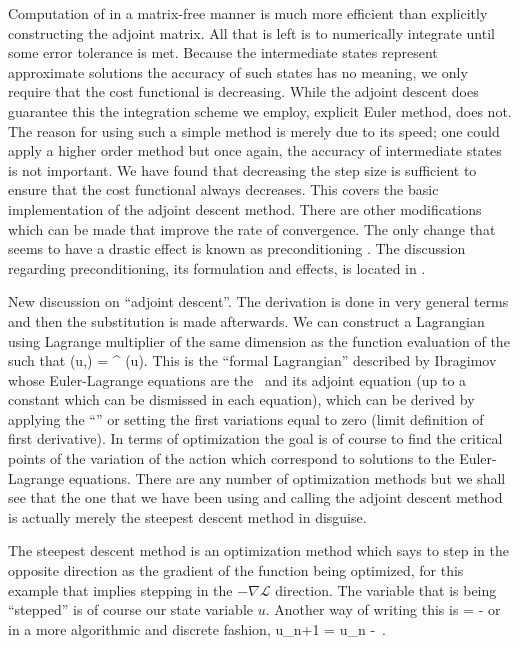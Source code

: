 Computation of  in a matrix-free manner
is much more efficient than explicitly constructing the adjoint matrix.
All that is left is to numerically integrate  until
some error tolerance is met.
Because the intermediate states represent
approximate solutions the accuracy of such states has no meaning, we only
require that the cost functional  is decreasing.
While the adjoint descent does guarantee this
the integration scheme we employ, explicit Euler method, does not. The reason
for using such a simple method is merely due to its speed; one could apply a higher
order method but once again, the accuracy of intermediate states is not important.
We have found that decreasing the step size
is sufficient to ensure that the cost functional always decreases.
This covers the basic implementation of the adjoint descent method. There
are other modifications which can be made that improve the rate of convergence.
The only change that seems to have a drastic effect is known as preconditioning .
The discussion regarding preconditioning, its
formulation and effects, is located in .


New discussion on ``adjoint descent''. The derivation
is done in very general terms and then the substitution
is made afterwards. We can construct a Lagrangian using Lagrange
multiplier of the same dimension as the function evaluation of the \KSe
such that
\beq \label{e-lagrangemultiplier}
(u,\lambda) =  \lambda^{\top} (u).
\eeq
This is the ``formal Lagrangian'' described by Ibragimov
whose Euler-Lagrange equations are the
\KSe\ and its adjoint equation 
 (up to a constant
which can be dismissed in each equation), which
can be derived by applying the ``'' or
setting the first variations equal to zero (limit definition
of first derivative). In terms of optimization the goal
is of course to find the critical points of the variation
of the action which correspond to solutions to the
Euler-Lagrange equations. There are any number of optimization
methods but we shall see that the one that we have been using
and calling the adjoint descent method is actually merely the
steepest descent method in disguise.

The steepest descent method is an optimization method which
says to step in the opposite direction as the gradient
of the function being optimized, for this example that
implies stepping in the $-\nabla \mathcal{L}$ direction.
The variable that is being ``stepped'' is of course our
state variable $u$. Another way of writing this is
\beq
{} = -\nabla {}
\eeq
or in a more algorithmic and discrete fashion,
\beq
u_{n+1} = u_{n} -\nabla {} \delta \tau \,.
\eeq

